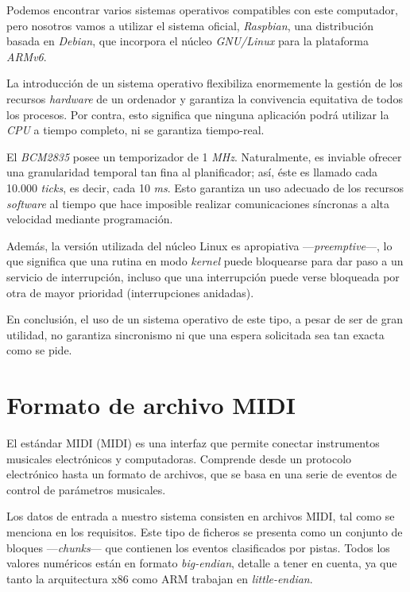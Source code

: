 Podemos encontrar varios sistemas operativos compatibles con este computador, pero nosotros vamos a utilizar el sistema oficial, \textit{Raspbian}, una distribución basada en \textit{Debian}, que incorpora el núcleo \textit{GNU/Linux} para la plataforma \textit{ARMv6}.

La introducción de un sistema operativo flexibiliza enormemente la gestión de los recursos \textit{hardware} de un ordenador y garantiza la convivencia equitativa de todos los procesos. Por contra, esto significa que ninguna aplicación podrá utilizar la \textit{CPU} a tiempo completo, ni se garantiza tiempo-real.

El \textit{BCM2835} posee un temporizador de 1 \textit{MHz}. Naturalmente, es inviable ofrecer una granularidad temporal tan fina al planificador; así, éste es llamado cada 10.000 \textit{ticks}, es decir, cada 10 \textit{ms}. Esto garantiza un uso adecuado de los recursos \textit{software} al tiempo que hace imposible realizar comunicaciones síncronas a alta velocidad mediante programación.

Además, la versión utilizada del núcleo Linux es apropiativa ---\textit{preemptive}---, lo que significa que una rutina en modo \textit{kernel} puede bloquearse para dar paso a un servicio de interrupción, incluso que una interrupción puede verse bloqueada por otra de mayor prioridad (interrupciones anidadas).

En conclusión, el uso de un sistema operativo de este tipo, a pesar de ser de gran utilidad, no garantiza sincronismo ni que una espera solicitada sea tan exacta como se pide.

\section{Formato de archivo MIDI}

El estándar \acrshort{MIDI} (\acrlong{MIDI}) es una interfaz que permite conectar instrumentos musicales electrónicos y computadoras. Comprende desde un protocolo electrónico hasta un formato de archivos, que se basa en una serie de eventos de control de parámetros musicales. \cite{wiki_midi}

Los datos de entrada a nuestro sistema consisten en archivos \acrshort{MIDI}, tal como se menciona en los requisitos. Este tipo de ficheros se presenta como un conjunto de bloques ---\textit{chunks}--- que contienen los eventos clasificados por pistas. Todos los valores numéricos están en formato \textit{big-endian}, detalle a tener en cuenta, ya que tanto la arquitectura x86 como ARM trabajan en \textit{little-endian}. \cite{midi}

